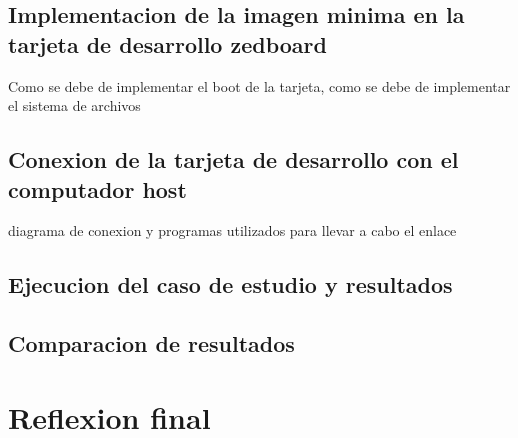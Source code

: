 \subsection{Implementacion de la imagen minima en la tarjeta de desarrollo zedboard}
Como se debe de implementar el boot de la tarjeta, como se debe de implementar el  sistema de archivos
\subsection{Conexion de la tarjeta de desarrollo con el computador host}
diagrama de conexion y programas utilizados para llevar a cabo el enlace

\subsection{Ejecucion del caso de estudio y resultados}

\subsection{Comparacion de resultados}

\section{Reflexion final}